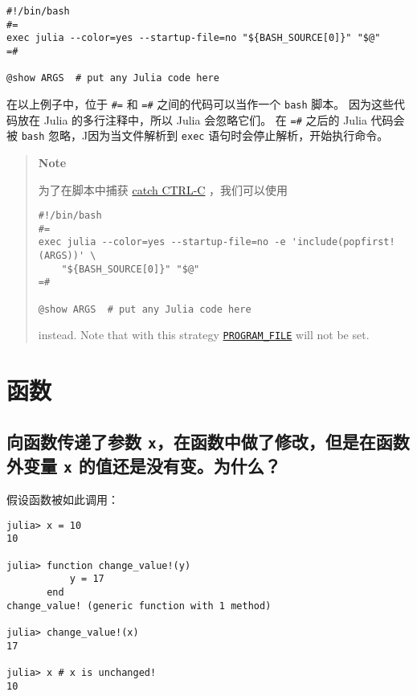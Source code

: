\begin{verbatim}
#!/bin/bash
#=
exec julia --color=yes --startup-file=no "${BASH_SOURCE[0]}" "$@"
=#

@show ARGS  # put any Julia code here
\end{verbatim}



在以上例子中，位于 \texttt{\#=} 和 \texttt{=\#} 之间的代码可以当作一个 \texttt{bash} 脚本。 因为这些代码放在 Julia 的多行注释中，所以 Julia 会忽略它们。 在 \texttt{=\#} 之后的 Julia 代码会被 \texttt{bash} 忽略，J因为当文件解析到 \texttt{exec} 语句时会停止解析，开始执行命令。



\begin{quote}
\textbf{Note}

为了在脚本中捕获 \hyperlink{15294909856889946817}{catch CTRL-C} ，我们可以使用


\begin{verbatim}
#!/bin/bash
#=
exec julia --color=yes --startup-file=no -e 'include(popfirst!(ARGS))' \
    "${BASH_SOURCE[0]}" "$@"
=#

@show ARGS  # put any Julia code here
\end{verbatim}

instead. Note that with this strategy \hyperlink{9054270179006636705}{\texttt{PROGRAM\_FILE}} will not be set.

\end{quote}


\hypertarget{5727276226756196747}{}


\section{函数}



\hypertarget{7382572299104431822}{}


\subsection{向函数传递了参数 \texttt{x}，在函数中做了修改，但是在函数外变量 \texttt{x} 的值还是没有变。为什么？}



假设函数被如此调用：




\begin{verbatim}
julia> x = 10
10

julia> function change_value!(y)
           y = 17
       end
change_value! (generic function with 1 method)

julia> change_value!(x)
17

julia> x # x is unchanged!
10
\end{verbatim}



